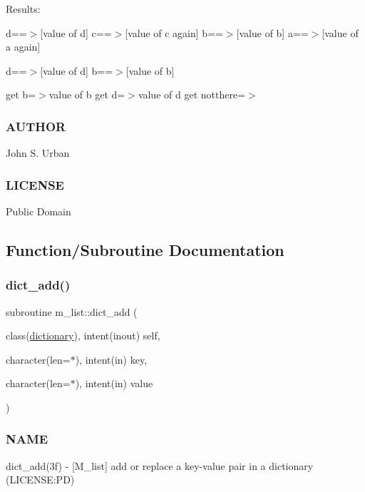 Results\+:

d==$>$\mbox{[}value of d\mbox{]} c==$>$\mbox{[}value of c again\mbox{]} b==$>$\mbox{[}value of b\mbox{]} a==$>$\mbox{[}value of a again\mbox{]}

d==$>$\mbox{[}value of d\mbox{]} b==$>$\mbox{[}value of b\mbox{]}

get b=$>$value of b get d=$>$value of d get notthere=$>$

\subsubsection*{A\+U\+T\+H\+OR}

John S. Urban \subsubsection*{L\+I\+C\+E\+N\+SE}

Public Domain 

\subsection{Function/\+Subroutine Documentation}
\mbox{\label{namespacem__list_aca66691fd75ea79859a1b4505d2125bb}} 
\subsubsection{\texorpdfstring{dict\+\_\+add()}{dict\_add()}}
{\footnotesize\ttfamily subroutine m\+\_\+list\+::dict\+\_\+add (\begin{DoxyParamCaption}\item[{class(\mbox{\hyperlink{structm__list_1_1dictionary}{dictionary}}), intent(inout)}]{self,  }\item[{character(len=$\ast$), intent(in)}]{key,  }\item[{character(len=$\ast$), intent(in)}]{value }\end{DoxyParamCaption})\hspace{0.3cm}{\ttfamily [private]}}



\subsubsection*{N\+A\+ME}

dict\+\_\+add(3f) -\/ \mbox{[}M\+\_\+list\mbox{]} add or replace a key-\/value pair in a dictionary (L\+I\+C\+E\+N\+SE\+:PD) 

